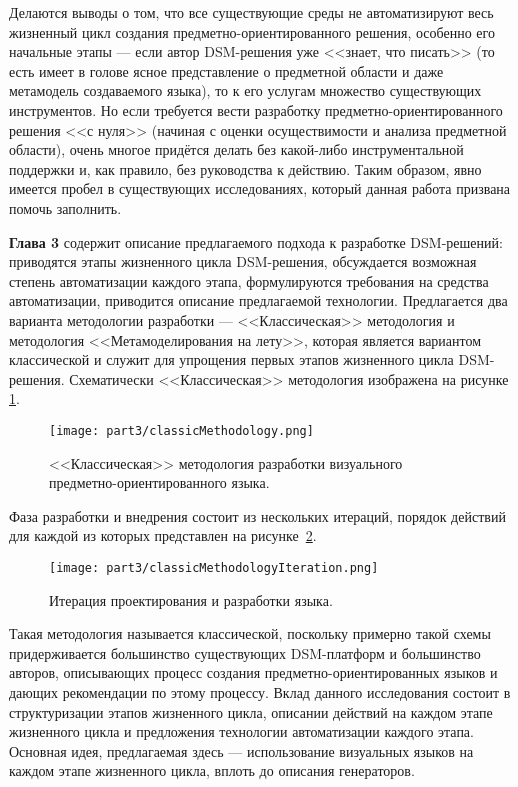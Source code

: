 Делаются выводы о том, что все существующие среды не автоматизируют весь жизненный цикл
создания предметно-ориентированного решения, особенно его начальные этапы --- если автор DSM-решения уже 
<<знает, что писать>> (то есть имеет в голове ясное представление о предметной области 
и даже метамодель создаваемого языка), то к его услугам множество существующих инструментов. 
Но если требуется вести разработку предметно-ориентированного решения <<с нуля>> (начиная 
с оценки осуществимости и анализа предметной области), очень многое придётся делать 
без какой-либо инструментальной поддержки и, как правило, без руководства к действию.
Таким образом, явно имеется пробел в существующих исследованиях, который данная работа
призвана помочь заполнить.

\textbf{Глава 3} содержит описание предлагаемого подхода к разработке 
DSM-решений: приводятся этапы жизненного цикла DSM-решения, обсуждается 
возможная степень автоматизации каждого этапа, формулируются требования на 
средства автоматизации, приводится описание предлагаемой технологии. Предлагается
два варианта методологии разработки --- <<Классическая>> методология и методология <<Метамоделирования
на лету>>, которая является вариантом классической и служит для упрощения первых этапов
жизненного цикла DSM-решения. Схематически <<Классическая>> методология изображена на рисунке
\ref{classicMethodology}.

\begin{figure} [ht]
	\begin{center}
		\texttt{[image: part3/classicMethodology.png]}
		\caption{<<Классическая>> методология разработки визуального предметно-ориентированного языка.}
		\label{classicMethodology}
	\end{center}
\end{figure}

Фаза разработки и внедрения состоит из нескольких итераций, порядок действий для каждой 
из которых представлен на рисунке~\ref{classicMethodologyIteration}. 

\begin{figure} [ht]
	\begin{center}
		\texttt{[image: part3/classicMethodologyIteration.png]}
		\caption{Итерация проектирования и разработки языка.}
		\label{classicMethodologyIteration}
	\end{center}
\end{figure}

Такая методология называется классической, поскольку примерно такой схемы придерживается
большинство существующих DSM-платформ и большинство авторов, описывающих процесс создания
предметно-ориентированных языков и дающих рекомендации по этому процессу. Вклад данного 
исследования состоит в структуризации этапов жизненного цикла, описании действий на 
каждом этапе жизненного цикла и предложения технологии автоматизации каждого этапа.
Основная идея, предлагаемая здесь --- использование визуальных языков на каждом
этапе жизненного цикла, вплоть до описания генераторов.

